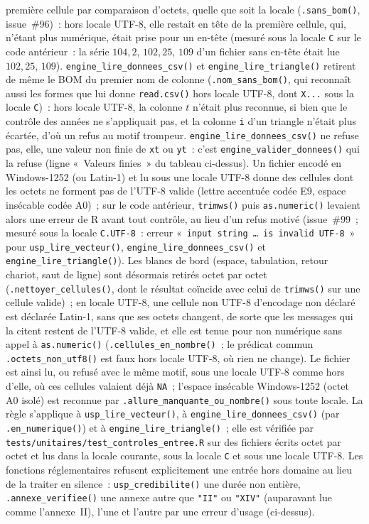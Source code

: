\documentclass[a4paper,11pt]{article}
\newcommand{\code}[1]{\texttt{\small #1}}
\begin{document}
première cellule par comparaison d'octets, quelle que soit la locale (\code{.sans\_bom()},
issue~\#96)~: hors locale UTF-8, elle restait en tête de la première cellule, qui, n'étant plus
numérique, était prise pour un en-tête (mesuré sous la locale \code{C} sur le code
antérieur~: la série $104{,}2$, $102{,}25$, $109$ d'un fichier sans en-tête était lue $102{,}25$,
$109$). \code{engine\_lire\_donnees\_csv()} et \code{engine\_lire\_triangle()} retirent de même
le BOM du premier nom de colonne (\code{.nom\_sans\_bom()}, qui reconnaît aussi les formes que
lui donne \code{read.csv()} hors locale UTF-8, dont \code{X...} sous la locale \code{C})~: hors
locale UTF-8, la colonne $t$ n'était plus reconnue, si bien que le contrôle des années ne
s'appliquait pas, et la colonne \code{i} d'un triangle n'était plus écartée, d'où un refus au
motif trompeur.
\code{engine\_lire\_donnees\_csv()} ne refuse pas, elle, une valeur non finie de \code{xt} ou
\code{yt}~: c'est \code{engine\_valider\_donnees()} qui la refuse (ligne «~Valeurs finies~» du
tableau ci-dessus). Un fichier encodé en Windows-1252 (ou Latin-1) et lu sous une locale UTF-8
donne des cellules dont les octets ne forment pas de l'UTF-8 valide (lettre accentuée codée
E9, espace insécable codée A0)~; sur le code antérieur, \code{trimws()} puis
\code{as.numeric()} levaient alors une erreur de R avant tout contrôle, au lieu d'un refus
motivé (issue~\#99~; mesuré sous la locale \code{C.UTF-8}~: erreur «~\code{input string \ldots{} is invalid
UTF-8}~» pour \code{usp\_lire\_vecteur()}, \code{engine\_lire\_donnees\_csv()} et
\code{engine\_lire\_triangle()}). Les blancs de bord (espace, tabulation, retour chariot, saut
de ligne) sont désormais retirés octet par octet (\code{.nettoyer\_cellules()}, dont le
résultat coïncide avec celui de \code{trimws()} sur une cellule valide)~; en locale UTF-8, une
cellule non UTF-8 d'encodage non déclaré est déclarée Latin-1, sans que ses octets changent,
de sorte que les messages qui la citent restent de l'UTF-8 valide, et elle est tenue pour non
numérique sans appel à \code{as.numeric()} (\code{.cellules\_en\_nombre()}~; le prédicat
commun \code{.octets\_non\_utf8()} est faux hors locale UTF-8, où rien ne change). Le fichier
est ainsi lu, ou refusé avec le même motif, sous une locale UTF-8 comme hors d'elle, où ces
cellules valaient déjà \code{NA}~; l'espace insécable Windows-1252 (octet A0 isolé) est
reconnue par \code{.allure\_manquante\_ou\_nombre()} sous toute locale. La règle s'applique à
\code{usp\_lire\_vecteur()}, à \code{engine\_lire\_donnees\_csv()} (par
\code{.en\_numerique()}) et à \code{engine\_lire\_triangle()}~; elle est vérifiée par
\code{tests/unitaires/test\_controles\_entree.R} sur des fichiers écrits octet par octet et
lus dans la locale courante, sous la locale \code{C} et sous une locale UTF-8. Les fonctions réglementaires refusent explicitement une entrée hors
domaine au lieu de la traiter en silence~: \code{usp\_credibilite()} une durée non entière,
\code{.annexe\_verifiee()} une annexe autre que \code{"II"} ou \code{"XIV"} (auparavant lue
comme l'annexe~II), l'une et l'autre par une erreur d'usage (ci-dessus).
\end{document}
